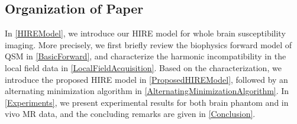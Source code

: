 \documentclass[reqno]{siamonline1116}
\numberwithin{theorem}{section}
\numberwithin{equation}{section}
\def\Om{\Omega}
\def\p{\partial}
\begin{document}
%	

\subsection{Organization of Paper}\label{Organization}

In \cref{HIREModel}, we introduce our HIRE model for whole brain susceptibility imaging. More precisely, we first briefly review the biophysics forward model of QSM in \cref{BasicForward}, and characterize the harmonic incompatibility in the local field data in \cref{LocalFieldAcquisition}. Based on the characterization, we introduce the proposed HIRE model in \cref{ProposedHIREModel}, followed by an alternating minimization algorithm in \cref{AlternatingMinimizationAlgorithm}. In \cref{Experiments}, we present experimental results for both brain phantom and in vivo MR data, and the concluding remarks are given in \cref{Conclusion}.
\end{document}
